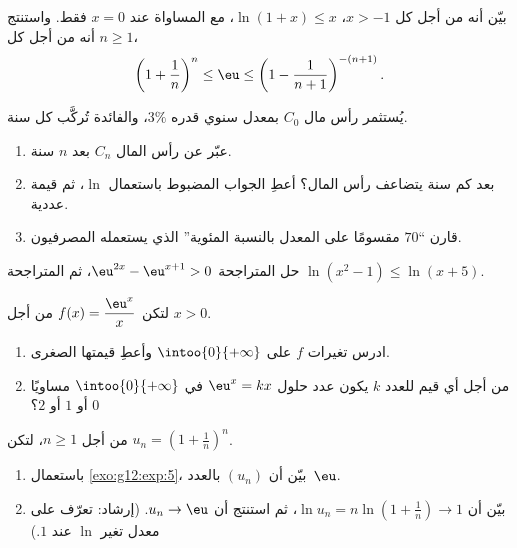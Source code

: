 \begin{exercise}[$\star\star$]\label{exo:g12:exp:5}
بيّن أنه من أجل كل $x > -1$، $\ln(1 + x) \leq x$، مع المساواة عند
$x = 0$ فقط. واستنتج أنه من أجل كل $n \geq 1$،
\[
\left(1 + \frac{1}{n}\right)^n \leq \eu \leq \left(1 - \frac{1}{n+1}\right)^{-(n+1)} .
\]
\end{exercise}

\begin{exercise}[$\star\star$]\label{exo:g12:exp:6}
يُستثمر رأس مال $C_0$ بمعدل سنوي قدره $3\%$، والفائدة تُركَّب
كل سنة.
\begin{enumerate}
  \item عبّر عن رأس المال $C_n$ بعد $n$ سنة.
  \item بعد كم سنة يتضاعف رأس المال؟ أعطِ الجواب المضبوط
        باستعمال $\ln$، ثم قيمة عددية.
  \item قارن  ``$70$ مقسومًا على المعدل بالنسبة
        المئوية'' الذي يستعمله المصرفيون.
\end{enumerate}
\end{exercise}

\begin{exercise}[$\star\star$]\label{exo:g12:exp:7}
حل المتراجحة $\eu^{2x} - \eu^{x+1} > 0$، ثم المتراجحة
$\ln(x^2 - 1) \leq \ln(x + 5)$.
\end{exercise}

\begin{exercise}[$\star\star\star$]\label{exo:g12:exp:8}
لتكن $f(x) = \dfrac{\eu^x}{x}$ من أجل $x > 0$.
\begin{enumerate}
  \item ادرس تغيرات $f$ على $\intoo{0}{+\infty}$ وأعطِ
        قيمتها الصغرى.
  \item من أجل أي قيم للعدد $k$ يكون عدد حلول  $\eu^x = kx$
        في $\intoo{0}{+\infty}$ مساويًا $0$ أو $1$ أو $2$؟
\end{enumerate}
\end{exercise}

\begin{exercise}[$\star\star\star$]\label{exo:g12:exp:9}
من أجل $n \geq 1$، لتكن $u_n = \left(1 + \frac1n\right)^n$.
\begin{enumerate}
  \item باستعمال \cref{exo:g12:exp:5}، بيّن أن $(u_n)$ 
        بالعدد~$\eu$.
  \item بيّن أن $\ln u_n = n \ln\left(1 + \frac1n\right) \to 1$، ثم
        استنتج أن $u_n \to \eu$.
        (إرشاد: تعرّف على معدل تغير  $\ln$ عند $1$.)
\end{enumerate}
\end{exercise}

